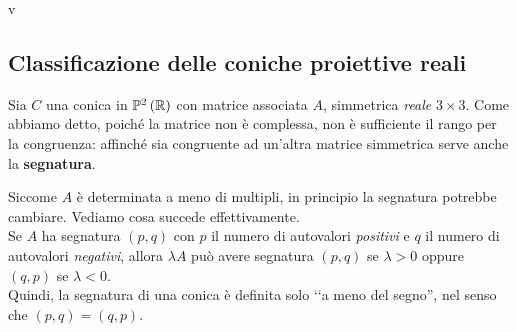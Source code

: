v\subsection{Classificazione delle coniche proiettive reali}
Sia $C$ una conica in $\proj[2]{\realset}$ con matrice associata $A$, simmetrica \textit{reale} $3\times 3$. Come abbiamo detto, poiché la matrice non è complessa, non è sufficiente il rango per la congruenza: affinché sia congruente ad un'altra matrice simmetrica serve anche la \textbf{segnatura}.
\begin{observe}
Siccome $A$ è determinata a meno di multipli, in principio la segnatura potrebbe cambiare. Vediamo cosa succede effettivamente.\\
Se $A$ ha segnatura $(p,q)$ con $p$ il numero di autovalori \textit{positivi} e $q$ il numero di autovalori \textit{negativi}, allora $\lambda A$ può avere segnatura $(p,q)$ se $\lambda>0$ oppure $(q,p)$ se $\lambda <0$.\\
Quindi, la segnatura di una conica è definita solo ‘‘a meno del segno'', nel senso che $(p,q)=(q,p)$.
\end{observe}
